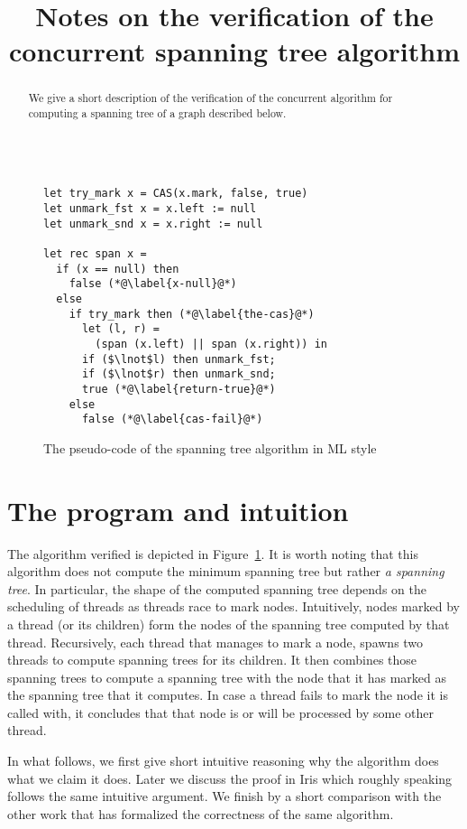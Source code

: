 \documentclass[nocopyrightspace]{sigplanconf}
\title{Notes on the verification of the concurrent spanning tree algorithm}
\begin{document}
\maketitle

\begin{abstract}
We give a short description of the verification of the concurrent algorithm for computing
a spanning tree of a graph described below.
\end{abstract}

\begin{figure}
\begin{lstlisting}[mathescape=true, language=MyML]

let try_mark x = CAS(x.mark, false, true)
let unmark_fst x = x.left := null
let unmark_snd x = x.right := null

let rec span x =
  if (x == null) then
    false (*@\label{x-null}@*)
  else
    if try_mark then (*@\label{the-cas}@*)
      let (l, r) =
        (span (x.left) || span (x.right)) in
      if ($\lnot$l) then unmark_fst;
      if ($\lnot$r) then unmark_snd;
      true (*@\label{return-true}@*)
    else
      false (*@\label{cas-fail}@*)
\end{lstlisting}
\caption{The pseudo-code of the spanning tree algorithm in ML style}
\label{fig:code}
\end{figure}

\section{The program and intuition}
The algorithm verified is depicted in Figure~\ref{fig:code}.
It is worth noting that this algorithm does not compute the minimum
spanning tree but rather \emph{a spanning tree}.
In particular, the shape of the computed spanning tree depends on the
scheduling of threads as threads race to mark nodes.
Intuitively, nodes marked by a thread (or its children) form the nodes of
the spanning tree computed by that thread.
Recursively, each thread that manages to mark a node, spawns two
threads to compute spanning trees for its children. 
It then combines those spanning trees to compute a spanning tree with
the node that it has marked as the spanning tree that it computes.
In case a thread fails to mark the node it is called with, it concludes that
that node is or will be processed by some other thread.

In what follows, we first give short intuitive reasoning why the algorithm
does what we claim it does.
Later we discuss the proof in Iris which roughly speaking follows the
same intuitive argument.
We finish by a short comparison with the other work that has formalized
the correctness of the same algorithm.
\end{document}
